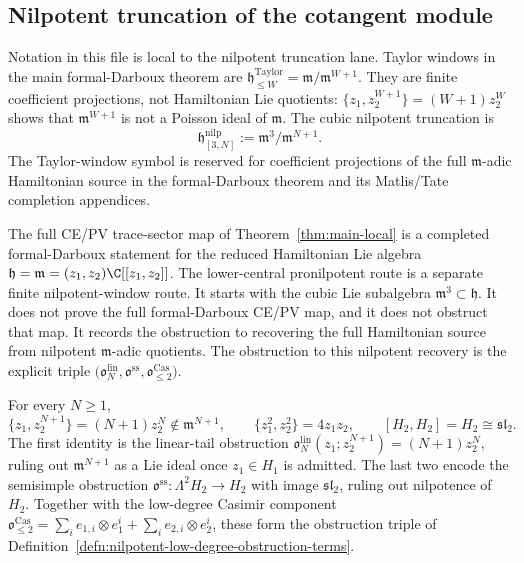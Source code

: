 \subsection*{Nilpotent truncation of the cotangent module}

Notation in this file is local to the nilpotent truncation lane.  Taylor
windows in the main formal-Darboux theorem are
\(\mathfrak h^{\mathrm{Taylor}}_{\leq W}=\mathfrak m/\mathfrak m^{W+1}\).
They are finite coefficient projections, not Hamiltonian Lie quotients:
\(\{z_1,z_2^{W+1}\}=(W+1)z_2^W\) shows that
\(\mathfrak m^{W+1}\) is not a Poisson ideal of \(\mathfrak m\).
The cubic nilpotent truncation is
\[
  \mathfrak h^{\mathrm{nilp}}_{[3,N]}
  :=\mathfrak m^3/\mathfrak m^{N+1}.
\]
The Taylor-window symbol is reserved for coefficient projections of the
full \(\mathfrak m\)-adic Hamiltonian source in the formal-Darboux theorem
and its Matlis/Tate completion appendices.

The full CE/PV trace-sector map of Theorem~\ref{thm:main-local} is a
completed formal-Darboux statement for the reduced Hamiltonian Lie algebra
\(\mathfrak h=\mathfrak m=(z_1,z_2)\C[[z_1,z_2]]\).  The lower-central
pronilpotent route is a separate finite nilpotent-window route.  It
starts with the cubic Lie subalgebra
\(\mathfrak m^3\subset\mathfrak h\).  It does not prove the full
formal-Darboux CE/PV map, and it does not obstruct that map.  It records
the obstruction to recovering the full Hamiltonian source from
nilpotent \(\mathfrak m\)-adic quotients.  The obstruction to this
nilpotent recovery is the explicit triple
\(\bigl(\mathfrak o^{\mathrm{lin}}_N,\mathfrak o^{\mathrm{ss}},
\mathfrak o^{\mathrm{Cas}}_{\leq2}\bigr)\).

For every $N\geq 1$,
\[
  \{z_1,z_2^{N+1}\}=(N+1)z_2^N\notin\mathfrak m^{N+1},\qquad
  \{z_1^2,z_2^2\}=4z_1z_2,\qquad [H_2,H_2]=H_2\cong\mathfrak{sl}_2.
\]
The first identity is the linear-tail obstruction
$\mathfrak o^{\mathrm{lin}}_N(z_1;z_2^{N+1})=(N+1)z_2^N$, ruling out
$\mathfrak m^{N+1}$ as a Lie ideal once $z_1\in H_1$ is admitted.  The
last two encode the semisimple obstruction
$\mathfrak o^{\mathrm{ss}}\colon\Lambda^2H_2\to H_2$ with image
$\mathfrak{sl}_2$, ruling out nilpotence of $H_2$.  Together with the
low-degree Casimir component
$\mathfrak o^{\mathrm{Cas}}_{\leq2}=\sum_ie_{1,i}\otimes
e_1^i+\sum_ie_{2,i}\otimes e_2^i$, these form the obstruction triple
of Definition~\ref{defn:nilpotent-low-degree-obstruction-terms}.

